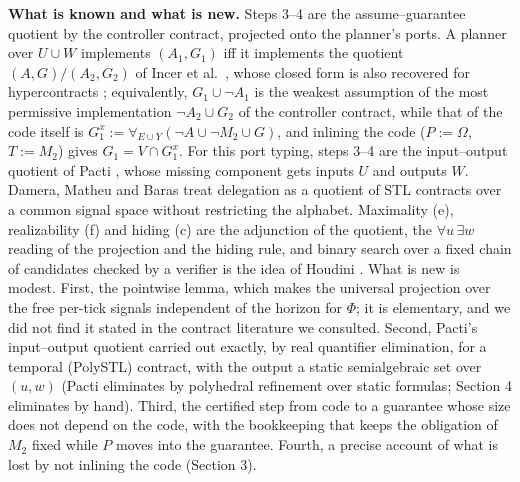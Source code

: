 \documentclass[10pt,a4paper]{article}
\makeatletter
\renewcommand\section{\@startsection{section}{1}{0pt}{0.8ex plus .2ex}{0.4ex}{\normalfont\large\bfseries}}
\newcommand{\fa}{\forall}
\makeatother
\begin{document}
\textbf{What is known and what is new.} Steps 3--4 are the assume--guarantee quotient by the controller contract, projected onto the planner's ports. A planner over $U\cup W$ implements $(A_1,G_1)$ iff it implements the quotient $(A,G)/(A_2,G_2)$ of Incer et al.\ \cite{quot}, whose closed form is also recovered for hypercontracts \cite{hyper}; equivalently, $G_1\cup\lnot A_1$ is the weakest assumption \cite{gpb} of the most permissive implementation $\lnot A_2\cup G_2$ of the controller contract, while that of the code itself is $G_1^x:=\fa_{E\cup Y}(\lnot A\cup\lnot M_2\cup G)$, and inlining the code ($P:=\Omega$, $T:=M_2$) gives $G_1=V\cap G_1^x$. For this port typing, steps 3--4 are the input--output quotient of Pacti \cite{pacti}, whose missing component gets inputs $U$ and outputs $W$. Damera, Matheu and Baras \cite{dmb} treat delegation as a quotient of STL contracts over a common signal space without restricting the alphabet. Maximality (e), realizability (f) and hiding (c) are the adjunction of the quotient, the $\forall u\,\exists w$ reading of the projection and the hiding rule, and binary search over a fixed chain of candidates checked by a verifier is the idea of Houdini \cite{houdini}. What is new is modest. First, the pointwise lemma, which makes the universal projection over the free per-tick signals independent of the horizon for $\Phi$; it is elementary, and we did not find it stated in the contract literature we consulted. Second, Pacti's input--output quotient carried out exactly, by real quantifier elimination, for a temporal (PolySTL) contract, with the output a static semialgebraic set over $(u,w)$ (Pacti eliminates by polyhedral refinement over static formulas; Section 4 eliminates by hand). Third, the certified step from code to a guarantee whose size does not depend on the code, with the bookkeeping that keeps the obligation of $M_2$ fixed while $P$ moves into the guarantee. Fourth, a precise account of what is lost by not inlining the code (Section 3).

\section{Correctness}
\end{document}
